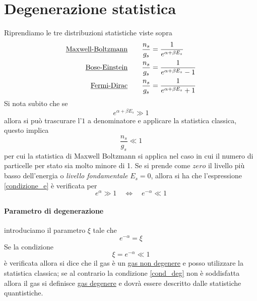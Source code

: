 
\section{Degenerazione statistica}
Riprendiamo le tre distribuzioni statistiche viste sopra
\begin{equation}
\begin{split}
\mbox{\underline{Maxwell-Boltzmann}}  \quad\quad  \frac{n_s}{g_s} & = \frac{1}{e^{\alpha + \beta E_s}} \\
\mbox{\underline{Bose-Einstein}}  \quad\quad  \frac{n_s}{g_s} & = \frac{1}{e^{\alpha + \beta E_s} - 1} \\
\mbox{\underline{Fermi-Dirac}}  \quad\quad  \frac{n_s}{g_s} & = \frac{1}{e^{\alpha + \beta E_s} + 1 } 
\end{split}
\end{equation}
Si nota subito che se 
\begin{equation}
e^{\alpha + \beta E_s} \gg 1
\label{condizione_e}
\end{equation}
allora si può trascurare l'$1$ a denominatore e applicare la statistica classica, questo implica
\begin{equation}
\frac{n_s}{g_s} \ll 1
\end{equation}
per cui la statistica di Maxwell Boltzmann si applica nel caso in cui il numero di particelle per stato sia molto minore di 1.
Se si prende come $zero$ il livello più basso dell'energia o \textit{livello fondamentale} $E_s = 0$, allora si ha che l'espressione \ref{condizione_e} è verificata per
\begin{equation}
e^{\alpha} \gg 1 \quad\Leftrightarrow\quad  e^{-\alpha} \ll 1
\end{equation}

\paragraph{Parametro di degenerazione} introduciamo il parametro $\xi$ tale che 
\begin{equation}
e^{-\alpha} = \xi 
\end{equation}
Se la condizione 
\begin{equation}
\xi = e^{-\alpha} \ll 1
\label{cond_deg}
\end{equation}
è verificata allora si dice che il gas è un \underline{gas non degenere} e posso utilizzare la statistica classica;
se al contrario la condizione \ref{cond_deg} non è soddisfatta allora il gas si definisce \underline{gas degenere} e dovrà essere descritto dalle statistiche quantistiche.

